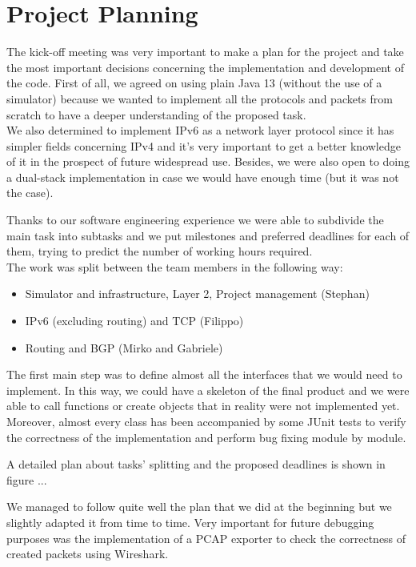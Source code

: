 \chapter{Project Planning}\label{projPlan}
The kick-off meeting was very important to make a plan for the project and take the most important decisions concerning the implementation and development of the code.
First of all, we agreed on using plain Java 13 (without the use of a simulator) because we wanted to implement all the protocols and packets from scratch to have a deeper understanding of the proposed task.\\
We also determined to implement IPv6 as a network layer protocol since it has simpler fields concerning IPv4 and it's very important to get a better knowledge of it in the prospect of future widespread use. Besides, we were also open to doing a dual-stack implementation in case we would have enough time (but it was not the case).

Thanks to our software engineering experience we were able to subdivide the main task into subtasks and we put milestones and preferred deadlines for each of them, trying to predict the number of working hours required.\\
The work was split between the team members in the following way:
\begin{itemize}
 \item Simulator and infrastructure, Layer 2, Project management (Stephan)
 \item IPv6 (excluding routing) and TCP (Filippo)
 \item Routing and BGP (Mirko and Gabriele)
\end{itemize}

The first main step was to define almost all the interfaces that we would need to implement.
In this way, we could have a skeleton of the final product and we were able to call functions or create objects that in reality were not implemented yet.
Moreover, almost every class has been accompanied by some JUnit tests to verify the correctness of the implementation and perform bug fixing module by module.

A detailed plan about tasks' splitting and the proposed deadlines is shown in figure ...


We managed to follow quite well the plan that we did at the beginning but we slightly adapted it from time to time.
Very important for future debugging purposes was the implementation of a PCAP exporter to check the correctness of created packets using Wireshark.

